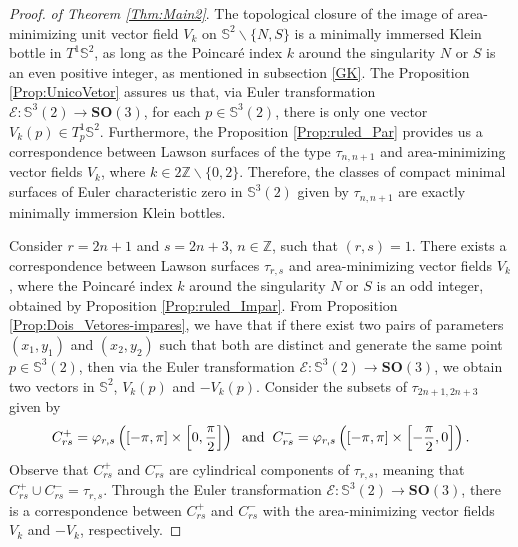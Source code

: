 \documentclass[reqno,11pt]{amsart}
\begin{document}
{\begin{proof} \textit{of Theorem \ref{Thm:Main2}}.
    The topological closure of the image of area-minimizing unit vector field $V_k$ on $\mathbb{S}^2\backslash\{N,S\}$ is a minimally immersed Klein bottle in $T^1\mathbb{S}^2$, as long as the Poincaré index $k$ around the singularity $N$ or $S$ is an even positive integer, as mentioned in subsection \ref{GK}. The Proposition \ref{Prop:UnicoVetor} assures us that, via Euler transformation $\mathcal{E}: \mathbb{S}^3(2) \rightarrow \mathbf{SO}(3)$, for each $p \in \mathbb{S}^3(2)$, there is only one vector $V_k(p) \in T^1_p \mathbb{S}^2$. Furthermore, the Proposition \ref{Prop:ruled_Par} provides us a correspondence between Lawson surfaces of the type $\tau_{n,n+1}$ and area-minimizing vector fields $V_k$, where $k \in 2\mathbb{Z}\backslash\{0,2\}$. Therefore, the classes of compact minimal surfaces of Euler characteristic zero in $\mathbb{S}^3(2)$ given by $\tau_{n,n+1}$ are exactly minimally immersion Klein bottles.

\noindent 
 Consider $r= 2n+1$ and $s=2n+3$, $n \in \mathbb{Z}$, such that $(r,s)=1$. There exists a correspondence between Lawson surfaces $\tau_{r,s}$ and area-minimizing vector fields $V_k$, where the Poincaré index $k$ around the singularity $N$ or $S$ is an odd integer, obtained by Proposition \ref{Prop:ruled_Impar}.  From Proposition \ref{Prop:Dois_Vetores-impares}, we have that if there exist two pairs of parameters $(x_1,y_1)$ and $(x_2,y_2)$ such that both are distinct and generate the same point $p \in \mathbb{S}^3(2)$, then via the Euler transformation $\mathcal{E}: \mathbb{S}^3(2) \rightarrow \mathbf{SO}(3)$, we obtain two vectors in $\mathbb{S}^2$, $V_k(p)$ and $-V_k(p)$. Consider the subsets of $\tau_{2n+1,2n+3}$ given by
\begin{eqnarray}\label{Eq:Lawson_Cylinders}
C_{rs}^+ = \varphi_{r,s}\left([-\pi , \pi]\times \left[0, \dfrac{\pi}{2}\right]\right)\hspace{0.2cm} \mbox{and} \hspace{0.2cm} C_{rs}^- = \varphi_{r,s}\left( \left[-\pi , \pi\right]\times \left[-\dfrac{\pi}{2},0\right]\right).    
\end{eqnarray}
Observe that $C_{rs}^+$ and $C_{rs}^-$ are cylindrical components of $\tau_{r,s}$, meaning that $C_{rs}^+\cup C_{rs}^- = \tau_{r,s}$. Through the Euler transformation $\mathcal{E}: \mathbb{S}^3(2) \rightarrow \mathbf{SO}(3)$, there is a correspondence between $C_{rs}^+$ and $C_{rs}^-$ with the area-minimizing vector fields $V_k$ and $-V_k$, respectively. 


\end{proof}}
\end{document}
